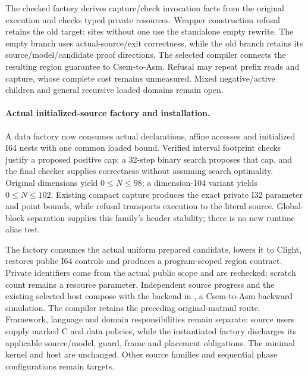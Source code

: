 The checked factory derives capture/check invocation facts from the original
execution and checks typed private resources. Wrapper construction refusal
retains the old target; sites without one use the standalone empty rewrite.
The empty branch uses actual-source/exit correctness, while the old branch
retains its source/model/candidate proof directions. The selected compiler
connects the resulting region guarantee to Csem-to-Asm. Refusal may repeat
prefix reads and capture, whose complete cost remains unmeasured. Mixed
negative/active children and general recursive loaded domains remain open.



\paragraph{Actual initialized-source factory and installation.}
A data factory now consumes actual declarations, affine accesses and initialized
I64 nests with one common loaded bound. Verified interval footprint checks
justify a proposed positive cap; a 32-step binary search proposes that cap,
and the final checker supplies correctness without assuming search optimality.
Original dimensions yield $0\leq N\leq98$; a dimension-104 variant yields
$0\leq N\leq102$. Existing compact capture produces the exact private I32
parameter and point bounds, while refusal transports execution to the literal
source. Global-block separation supplies this family's header stability;
there is no new runtime alias test.

The factory consumes the actual uniform prepared candidate, lowers it to
Clight, restores public I64 controls and produces a program-scoped region
contract. Private identifiers come from the actual public scope and are
rechecked; scratch count remains a resource parameter. Independent source
progress and the existing selected host compose with the backend in
, a Csem-to-Asm backward
simulation. The compiler retains the preceding original-matmul route.
Framework, language and domain responsibilities remain separate: source users
supply marked C and data policies, while the instantiated factory discharges
its applicable source/model, guard, frame and placement obligations. The
minimal kernel and host are unchanged. Other source families and sequential
phase configurations remain targets.

